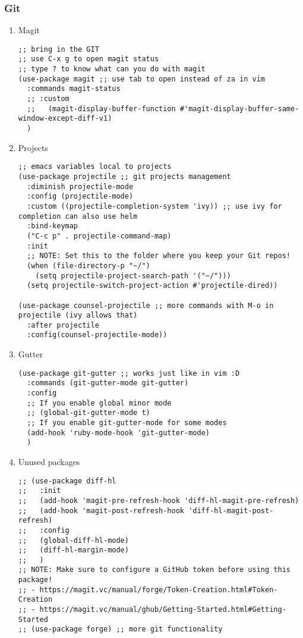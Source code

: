\documentclass[11pt]{article}
\begin{document}
\subsubsection{Git}
\label{sec:org6f72740}
\begin{enumerate}
\item Magit
\label{sec:org3fb0b7b}
\begin{verbatim}
;; bring in the GIT
;; use C-x g to open magit status
;; type ? to know what can you do with magit
(use-package magit ;; use tab to open instead of za in vim
  :commands magit-status
  ;; :custom
  ;;   (magit-display-buffer-function #'magit-display-buffer-same-window-except-diff-v1)
  )

\end{verbatim}

\item Projects
\label{sec:org2eef22d}
\begin{verbatim}
;; emacs variables local to projects
(use-package projectile ;; git projects management
  :diminish projectile-mode
  :config (projectile-mode)
  :custom ((projectile-completion-system 'ivy)) ;; use ivy for completion can also use helm
  :bind-keymap
  ("C-c p" . projectile-command-map)
  :init
  ;; NOTE: Set this to the folder where you keep your Git repos!
  (when (file-directory-p "~/")
    (setq projectile-project-search-path '("~/")))
  (setq projectile-switch-project-action #'projectile-dired))

(use-package counsel-projectile ;; more commands with M-o in projectile (ivy allows that)
  :after projectile
  :config(counsel-projectile-mode)) 
\end{verbatim}
\item Gutter
\label{sec:org241f0f5}

\begin{verbatim}
(use-package git-gutter ;; works just like in vim :D
  :commands (git-gutter-mode git-gutter)
  :config
  ;; If you enable global minor mode
  ;; (global-git-gutter-mode t)
  ;; If you enable git-gutter-mode for some modes
  (add-hook 'ruby-mode-hook 'git-gutter-mode)
  )
\end{verbatim}

\item Unused packages
\label{sec:orge2096c5}

\begin{verbatim}
;; (use-package diff-hl
;;   :init
;;   (add-hook 'magit-pre-refresh-hook 'diff-hl-magit-pre-refresh)
;;   (add-hook 'magit-post-refresh-hook 'diff-hl-magit-post-refresh)
;;   :config
;;   (global-diff-hl-mode)
;;   (diff-hl-margin-mode)
;;   )
;; NOTE: Make sure to configure a GitHub token before using this package!
;; - https://magit.vc/manual/forge/Token-Creation.html#Token-Creation
;; - https://magit.vc/manual/ghub/Getting-Started.html#Getting-Started
;; (use-package forge) ;; more git functionality


\end{verbatim}
\end{enumerate}
\end{document}
